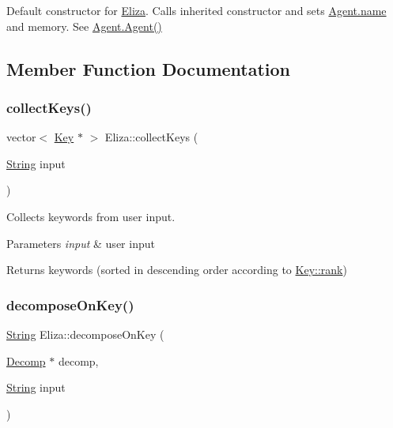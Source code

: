 Default constructor for \mbox{\hyperlink{classEliza}{Eliza}}. Calls inherited constructor and sets \mbox{\hyperlink{classAgent_a18b65b5aff8b98ba9316d6b75b5fc365}{Agent.\+name}} and memory. See \mbox{\hyperlink{classAgent_a3db4a9cfcea636c9d63ec73729225fc8}{Agent.\+Agent()}} 

\subsection{Member Function Documentation}
\mbox{\label{classEliza_adb573920365f86efd4974fa1af6e4f47}} 
\subsubsection{\texorpdfstring{collect\+Keys()}{collectKeys()}}
{\footnotesize\ttfamily vector$<$ \mbox{\hyperlink{classKey}{Key}} $\ast$ $>$ Eliza\+::collect\+Keys (\begin{DoxyParamCaption}\item[{\mbox{\hyperlink{classString}{String}}}]{input }\end{DoxyParamCaption})\hspace{0.3cm}{\ttfamily [private]}}

Collects keywords from user input. 
\begin{DoxyParams}{Parameters}
{\em input} & user input \\
\hline
\end{DoxyParams}
\begin{DoxyReturn}{Returns}
keywords (sorted in descending order according to \mbox{\hyperlink{classKey_ad960b9e4804c3cb039a816811bae4839}{Key\+::rank}}) 
\end{DoxyReturn}
\mbox{\label{classEliza_a74fbfaf3553aa9224ba10ef0881d6f14}} 
\subsubsection{\texorpdfstring{decompose\+On\+Key()}{decomposeOnKey()}}
{\footnotesize\ttfamily \mbox{\hyperlink{classString}{String}} Eliza\+::decompose\+On\+Key (\begin{DoxyParamCaption}\item[{\mbox{\hyperlink{classDecomp}{Decomp}} $\ast$}]{decomp,  }\item[{\mbox{\hyperlink{classString}{String}}}]{input }\end{DoxyParamCaption})\hspace{0.3cm}{\ttfamily [private]}}

